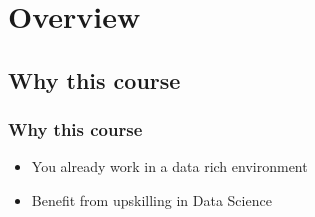 



\begin{frame}
   \titlepage
\end{frame}



\begin{frame}
   \tableofcontents
\end{frame}

\section{Overview}


\subsection{Why this course}
\begin{frame}\frametitle{Why this course}
   \begin{itemize}
      \item You already work in a data rich environment
      \item Benefit from upskilling in Data Science
   \end{itemize}
\end{frame}

